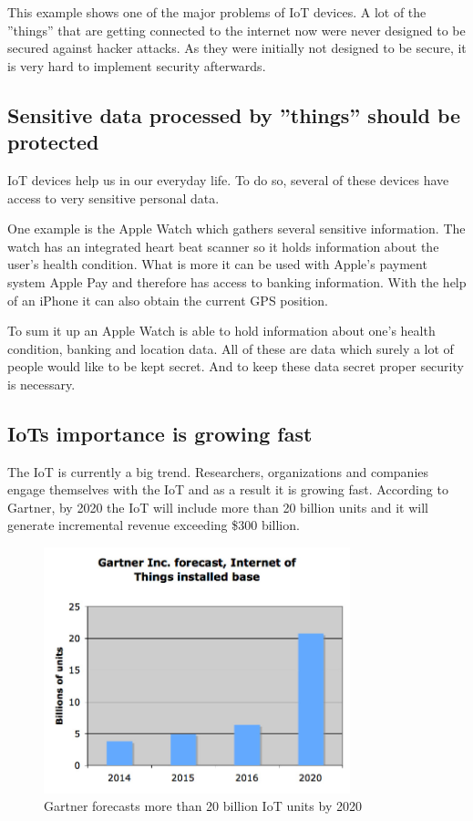 \documentclass[conference]{IEEEtran}
\begin{document}
This example shows one of the major problems of IoT devices. A lot of the 
''things'' that are getting connected to the internet now were never designed 
to be secured against hacker attacks. As they were initially not designed to be 
secure, it is very hard to implement security afterwards.

\subsection{Sensitive data processed by ''things'' should be protected}
IoT devices help us in our everyday life. To do so, several of these 
devices have access to very sensitive personal data. 

One example is the Apple Watch which gathers several sensitive information. The 
watch has an integrated heart beat scanner so it holds information about the 
user's health condition. What is more it can be used with Apple's payment 
system Apple Pay and therefore has access to banking information. With the help 
of an iPhone it can also obtain the current GPS position. 

To sum it up an Apple Watch is able to hold information about one's health 
condition, banking and location data. All of these are data which 
surely a lot of people would like to be kept secret. And to keep these data 
secret proper security is necessary.

\subsection{IoTs importance is growing fast}
The IoT is currently a big trend. Researchers, organizations and companies 
engage themselves with the IoT and as a result it is growing fast. According to 
Gartner, by 2020 the IoT will include more than 20 billion units and it will 
generate incremental revenue exceeding \$300 billion. \cite{gartnerPage}

\begin{figure}[!t]
\centering
\includegraphics[width=3.5in]{./img/gartnerForecast.jpg}
\caption{Gartner forecasts more than 20 billion IoT units by 2020}
\label{gartnerForecast}
\end{figure}
\end{document}
